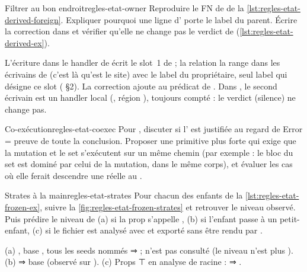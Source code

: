 \begin{exercice}{Filtrer  au bon endroit}{regles-etat-owner}
Reproduire le FN de  de la \cref{lst:regles-etat-derived-foreign}. Expliquer pourquoi une ligne  d' porte le label du parent. Écrire la correction dans  et vérifier qu'elle ne change pas le verdict de  (\cref{lst:regles-etat-derived-ex}).
\end{exercice}

\begin{solution}
L'écriture  dans le handler de  écrit le slot~1 de  ; la relation la range dans les écrivains de  (c'est là qu'est le site) avec le label du propriétaire, seul label qui désigne ce slot ( §2). La correction ajoute  au prédicat de . Dans , le second écrivain est un handler local (, région ), toujours compté : le verdict (silence) ne change pas.
\end{solution}

\begin{exercice}{Co-exécution}{regles-etat-coexec}
Pour , discuter si l'\Error{} est justifiée au regard de \og Error = preuve de toute la conclusion\fg. Proposer une primitive  plus forte qui exige que la mutation et le set s'exécutent sur un même chemin (par exemple : le bloc du set est dominé par celui de la mutation, dans le même corps), et évaluer les cas où elle ferait descendre une \Error{} réelle au \Warning.
\end{exercice}

\begin{exercice}{Strates à la main}{regles-etat-strates}
Pour chacun des enfants de la \cref{lst:regles-etat-frozen-ex}, suivre la \cref{fig:regles-etat-frozen-strates} et retrouver le niveau observé. Puis prédire le niveau de  (a) si la prop s'appelle , (b) si l'enfant passe  à un petit-enfant, (c) si le fichier est analysé avec  et  exporté sans être rendu par .
\end{exercice}

\begin{solution}
(a) , base \Error, tous les seeds nommés ⇒ \Warning ;  n'est pas consulté (le niveau n'est plus \Error). (b)  ⇒ base \Warning{} (observé sur ). (c) Props ⊤ en analyse de racine :  ⇒ \Warning.
\end{solution}
